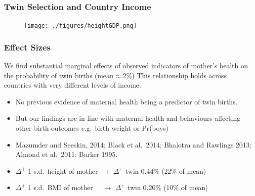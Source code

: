 \documentclass[9pt,letterpaper,subeqn]{beamer}
\begin{document}
\begin{frame}[label=Spain2]

\end{frame}

\begin{frame}[label=HealthGDP]
\frametitle{Twin Selection and Country Income}
\begin{figure}[htpb!]
\centering
  \texttt{[image: ./figures/heightGDP.png]}
\end{figure}
\hyperlink{EducGDP}{}
\end{frame}



\begin{frame}[label=robust]
\frametitle{Effect Sizes}
We find substantial marginal effects of observed indicators of mother’s health on the probability of twin births (mean$\approx$2\%)
This relationship holds across countries with very different levels of income.
\begin{itemize}
\item No previous evidence of maternal health being a predictor of twin births.
\item But our findings are in line with maternal health and behaviours affecting other birth outcomes e.g. birth weight or Pr(boys) 
\item Mazumder and Seeskin, 2014; Black et al.\ 2014;  Bhalotra and Rawlings 2013; Almond et al.\ 2011; Barker 1995.
  \item $\Delta^+$ 1 s.d.\ height of mother $\rightarrow$ $\Delta^+$ twin 0.44\% (22\% of mean)
  \item $\Delta^+$ 1 s.d.\ BMI of mother \ \ $\rightarrow$ $\Delta^+$ twin 0.20\% (10\% of mean)
\end{itemize}
\end{frame}
\end{document}
